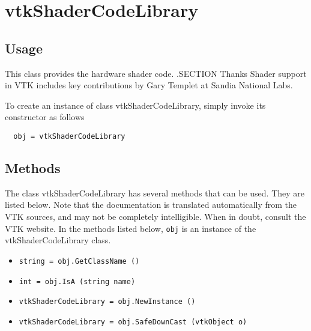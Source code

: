 \section{vtkShaderCodeLibrary}

\subsection{Usage}

 This class provides the hardware shader code.
 .SECTION Thanks
 Shader support in VTK includes key contributions by Gary Templet at 
 Sandia National Labs.

To create an instance of class vtkShaderCodeLibrary, simply
invoke its constructor as follows
\begin{verbatim}
  obj = vtkShaderCodeLibrary
\end{verbatim}
\subsection{Methods}

The class vtkShaderCodeLibrary has several methods that can be used.
  They are listed below.
Note that the documentation is translated automatically from the VTK sources,
and may not be completely intelligible.  When in doubt, consult the VTK website.
In the methods listed below, \verb|obj| is an instance of the vtkShaderCodeLibrary class.
\begin{itemize}
\item  \verb|string = obj.GetClassName ()|

\item  \verb|int = obj.IsA (string name)|

\item  \verb|vtkShaderCodeLibrary = obj.NewInstance ()|

\item  \verb|vtkShaderCodeLibrary = obj.SafeDownCast (vtkObject o)|

\end{itemize}
